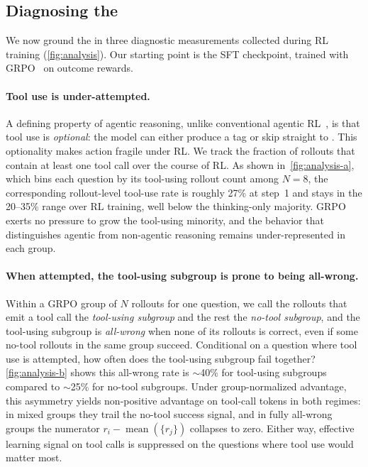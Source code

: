 \subsection{Diagnosing the \gap}
\label{sec:gap}


We now ground the \gap in three diagnostic measurements collected during RL training (\autoref{fig:analysis}). Our starting point is the SFT checkpoint, trained with GRPO~\citep{GRPO} on outcome rewards.

\paragraph{Tool use is under-attempted.}
A defining property of agentic reasoning, unlike conventional agentic RL~\citep{arpo, ragen2}, is that tool use is \emph{optional}: the model can either produce a \toolcall tag or skip straight to \answer. This optionality makes action fragile under RL.
We track the fraction of rollouts that contain at least one tool call over the course of RL. As shown in~\autoref{fig:analysis-a}, which bins each question by its tool-using rollout count among $N=8$, the corresponding rollout-level tool-use rate is roughly 27\% at step~1 and stays in the 20--35\% range over RL training, well below the thinking-only majority.
GRPO exerts no pressure to grow the tool-using minority, and the behavior that distinguishes agentic from non-agentic reasoning remains under-represented in each group.

\paragraph{When attempted, the tool-using subgroup is prone to being all-wrong.}
Within a GRPO group of $N$ rollouts for one question, we call the rollouts that emit a tool call the \emph{tool-using subgroup} and the rest the \emph{no-tool subgroup}, and the tool-using subgroup is \emph{all-wrong} when none of its rollouts is correct, even if some no-tool rollouts in the same group succeed. Conditional on a question where tool use is attempted, how often does the tool-using subgroup fail together? \autoref{fig:analysis-b} shows this all-wrong rate is $\sim$40\% for tool-using subgroups compared to $\sim$25\% for no-tool subgroups. Under group-normalized advantage, this asymmetry yields non-positive advantage on tool-call tokens in both regimes: in mixed groups they trail the no-tool success signal, and in fully all-wrong groups the numerator $r_i - \operatorname{mean}(\{r_j\})$ collapses to zero. Either way, effective learning signal on tool calls is suppressed on the questions where tool use would matter most.

